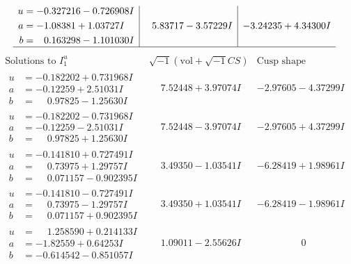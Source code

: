 \documentclass[1p]{elsarticle_modified}
\theoremstyle{definition}
\newcommand{\I}{\sqrt{-1}}
\begin{document}
$$\begin{array}{c|c|c}
\begin{aligned}
u &= -0.327216 - 0.726908 I \\
a &= -1.08381 + 1.03727 I \\
b &= \phantom{-}0.163298 - 1.101030 I\end{aligned}
 & \phantom{-}5.83717 - 3.57229 I & -3.24235 + 4.34300 I\\
 \hline 
 \end{array}$$\newpage$$\begin{array}{c|c|c}  
\text{Solutions to }I^u_{1}& \I (\text{vol} + \sqrt{-1}CS) & \text{Cusp shape}\\
 \hline 
\begin{aligned}
u &= -0.182202 + 0.731968 I \\
a &= -0.12259 + 2.51031 I \\
b &= \phantom{-}0.97825 - 1.25630 I\end{aligned}
 & \phantom{-}7.52448 + 3.97074 I & -2.97605 - 4.37299 I \\ \hline\begin{aligned}
u &= -0.182202 - 0.731968 I \\
a &= -0.12259 - 2.51031 I \\
b &= \phantom{-}0.97825 + 1.25630 I\end{aligned}
 & \phantom{-}7.52448 - 3.97074 I & -2.97605 + 4.37299 I \\ \hline\begin{aligned}
u &= -0.141810 + 0.727491 I \\
a &= \phantom{-}0.73975 + 1.29757 I \\
b &= \phantom{-}0.071157 - 0.902395 I\end{aligned}
 & \phantom{-}3.49350 - 1.03541 I & -6.28419 + 1.98961 I \\ \hline\begin{aligned}
u &= -0.141810 - 0.727491 I \\
a &= \phantom{-}0.73975 - 1.29757 I \\
b &= \phantom{-}0.071157 + 0.902395 I\end{aligned}
 & \phantom{-}3.49350 + 1.03541 I & -6.28419 - 1.98961 I \\ \hline\begin{aligned}
u &= \phantom{-}1.258590 + 0.214133 I \\
a &= -1.82559 + 0.64253 I \\
b &= -0.614542 - 0.851057 I\end{aligned}
 & \phantom{-}1.09011 - 2.55626 I & \phantom{-0.000000 } 0 \\ \hline\begin{aligned}

\end{aligned}
\end{array}$$
\end{document}
